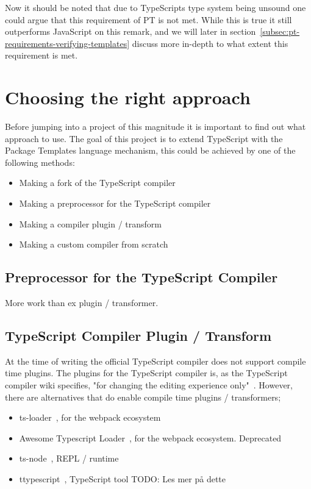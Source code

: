 Now it should be noted that due to TypeScripts type system being unsound one could argue that this requirement of PT is not met.
While this is true it still outperforms JavaScript on this remark, and we will later in section~\vref{subsec:pt-requirements-verifying-templates} discuss more in-depth to what extent this requirement is met.



\section{Choosing the right approach}\label{sec:choosing-the-right-approach}

Before jumping into a project of this magnitude it is important to find out what approach to use. 
The goal of this project is to extend TypeScript with the Package Templates language mechanism, this could be achieved by one of the following methods:

\begin{itemize}
    \item Making a fork of the TypeScript compiler
    \item Making a preprocessor for the TypeScript compiler
    \item Making a compiler plugin / transform
    \item Making a custom compiler from scratch
\end{itemize}


\subsection{Preprocessor for the TypeScript Compiler}\label{subsec:preprocessor-for-the-typescript-compiler}

More work than ex plugin / transformer.

\subsection{TypeScript Compiler Plugin / Transform}\label{subsec:typescript-compiler-plugin}

At the time of writing the official TypeScript compiler does not support compile time plugins.
The plugins for the TypeScript compiler is, as the TypeScript compiler wiki specifies, "for changing the editing experience only"~\cite{tscplugin}.
However, there are alternatives that do enable compile time plugins / transformers;

\begin{itemize}
    \item ts-loader~\cite{tsloadergithub}, for the webpack ecosystem
    \item Awesome Typescript Loader~\cite{awesometypescriptloadergithub}, for the webpack ecosystem. Deprecated
    \item ts-node~\cite{tsnodegithub}, REPL / runtime
    \item ttypescript~\cite{ttypescriptgithub}, TypeScript tool TODO: Les mer på dette
\end{itemize}


